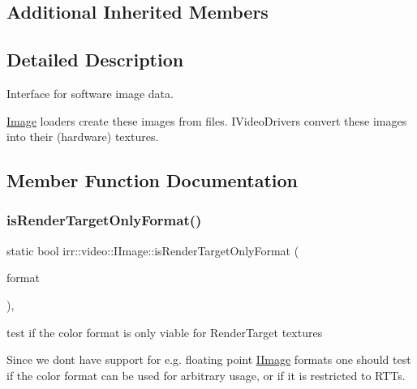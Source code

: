 \subsection*{Additional Inherited Members}


\subsection{Detailed Description}
Interface for software image data. 

\hyperlink{classImage}{Image} loaders create these images from files. I\+Video\+Drivers convert these images into their (hardware) textures. 

\subsection{Member Function Documentation}
\mbox{\label{classirr_1_1video_1_1IImage_aafbd373ef15670708010e0064ae3b946}} 
\subsubsection{\texorpdfstring{is\+Render\+Target\+Only\+Format()}{isRenderTargetOnlyFormat()}\hspace{0.1cm}{\footnotesize\ttfamily [1/2]}}
{\footnotesize\ttfamily static bool irr\+::video\+::\+I\+Image\+::is\+Render\+Target\+Only\+Format (\begin{DoxyParamCaption}\item[{const \hyperlink{namespaceirr_1_1video_a1d5e487888c32b1674a8f75116d829ed}{E\+C\+O\+L\+O\+R\+\_\+\+F\+O\+R\+M\+AT}}]{format }\end{DoxyParamCaption})\hspace{0.3cm}{\ttfamily [inline]}, {\ttfamily [static]}}



test if the color format is only viable for Render\+Target textures 

Since we don\textquotesingle{}t have support for e.\+g. floating point \hyperlink{classirr_1_1video_1_1IImage}{I\+Image} formats one should test if the color format can be used for arbitrary usage, or if it is restricted to R\+T\+Ts. \mbox{\label{classirr_1_1video_1_1IImage_aafbd373ef15670708010e0064ae3b946}} 

